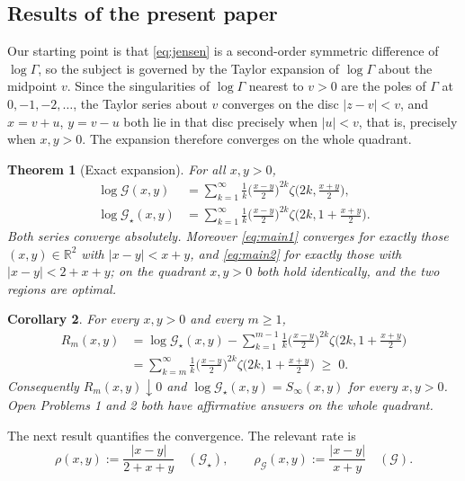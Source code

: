 \documentclass[11pt,a4paper]{amsart}
\newtheorem{theorem}{Theorem}[section]
\newtheorem{corollary}[theorem]{Corollary}
\theoremstyle{definition}
\newcommand{\Gg}{\mathcal{G}}
\newcommand{\Gs}{\mathcal{G}_{\star}}
\newcommand{\R}{\mathbb{R}}
\begin{document}
\subsection{Results of the present paper}
Our starting point is that \eqref{eq:jensen} is a second-order symmetric difference of
$\log\Gamma$, so the subject is governed by the Taylor expansion of $\log\Gamma$ about the
midpoint $v$. Since the singularities of $\log\Gamma$ nearest to $v>0$ are the poles of
$\Gamma$ at $0,-1,-2,\dots$, the Taylor series about $v$ converges on the disc $|z-v|<v$,
and $x=v+u$, $y=v-u$ both lie in that disc precisely when $|u|<v$, that is, precisely when
$x,y>0$. The expansion therefore converges on the whole quadrant.

\begin{theorem}[Exact expansion]\label{thm:main}
For all $x,y>0$,
\begin{align}
  \log\Gg(x,y)&=\sum_{k=1}^{\infty}\frac{1}{k}\Big(\frac{x-y}{2}\Big)^{2k}
      \zeta\Big(2k,\frac{x+y}{2}\Big),\label{eq:main1}\\[1mm]
  \log\Gs(x,y)&=\sum_{k=1}^{\infty}\frac{1}{k}\Big(\frac{x-y}{2}\Big)^{2k}
      \zeta\Big(2k,1+\frac{x+y}{2}\Big).\label{eq:main2}
\end{align}
Both series converge absolutely. Moreover \eqref{eq:main1} converges for exactly those
$(x,y)\in\R^{2}$ with $|x-y|<x+y$, and \eqref{eq:main2} for exactly those with
$|x-y|<2+x+y$; on the quadrant $x,y>0$ both hold identically, and the two regions are
optimal.
\end{theorem}

\begin{corollary}\label{cor:open12}
For every $x,y>0$ and every $m\ge1$,
\begin{align*}
  R_{m}(x,y)&=\log\Gs(x,y)-\sum_{k=1}^{m-1}\frac{1}{k}\Big(\frac{x-y}{2}\Big)^{2k}
     \zeta\Big(2k,1+\frac{x+y}{2}\Big)\\
  &=\sum_{k=m}^{\infty}\frac{1}{k}\Big(\frac{x-y}{2}\Big)^{2k}
     \zeta\Big(2k,1+\frac{x+y}{2}\Big)\;\ge\;0 .
\end{align*}
Consequently $R_{m}(x,y)\downarrow0$ and $\log\Gs(x,y)=S_{\infty}(x,y)$ for every
$x,y>0$. Open Problems 1 and 2 both have affirmative answers on the whole quadrant.
\end{corollary}

The next result quantifies the convergence. The relevant rate is
\begin{equation}\label{eq:rho}
  \rho(x,y):=\frac{|x-y|}{2+x+y}\quad(\Gs),\qquad
  \rho_{\Gg}(x,y):=\frac{|x-y|}{x+y}\quad(\Gg).
\end{equation}
\end{document}
